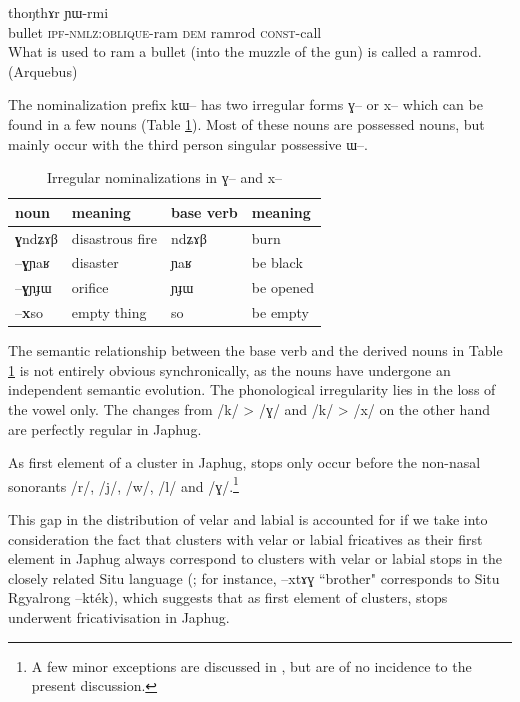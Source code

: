 \documentclass[oldfontcommands,oneside,a4paper,11pt]{article}
\newcommand{\ipa}[1]{{\phon \mbox{#1}}} %
\begin{document}
 \begin{exe}
\ex \label{ex:thongthar}
\gll [\ipa{qandʑi}   	\ipa{chɯ-sɤ-ɣnda}]   	\ipa{nɯ}   	\ipa{thoŋthɤr}   	  	\ipa{ɲɯ-rmi}    \\
bullet \textsc{ipf}-\textsc{nmlz:oblique}-ram   \textsc{dem} ramrod \textsc{const}-call \\
 \glt What is used to ram a bullet (into the muzzle of the gun) is called a ramrod. (Arquebus)
 \end{exe}


The nominalization prefix \ipa{kɯ}-- has two irregular forms   \ipa{ɣ}-- or \ipa{x}-- which can be found in a few nouns  (Table \ref{tab:irr.nmlz}). Most of these nouns are possessed nouns, but mainly occur with the third person singular possessive \ipa{ɯ}--.

\begin{table}[H]
\caption{Irregular nominalizations in \ipa{ɣ}-- and \ipa{x}--} \label{tab:irr.nmlz} \centering
\begin{tabular}{llll}
\toprule
 noun & meaning &base verb & meaning\\
\midrule
\ipa{\textbf{ɣ}ndʑɤβ} & disastrous fire & \ipa{ndʑɤβ} & burn \\
\ipa{--\textbf{ɣ}ɲaʁ}   &disaster& \ipa{ɲaʁ} & be black \\
\ipa{--\textbf{ɣ}ɲɟɯ}   & orifice & \ipa{ɲɟɯ} & be opened \\
\ipa{--\textbf{x}so}   &  empty thing &\ipa{so} & be empty \\
\bottomrule
\end{tabular}
\end{table}

The semantic relationship between the base verb and the derived nouns in Table \ref{tab:irr.nmlz} is not entirely obvious synchronically, as the nouns have undergone an independent semantic evolution. The phonological irregularity lies in the loss of the vowel only. The changes from /k/ > /ɣ/ and /k/ > /x/ on the other hand are perfectly regular in Japhug.

As first element of a cluster in Japhug, stops only occur before the non-nasal sonorants /r/, /j/, /w/, /l/ and /ɣ/.\footnote{A few minor exceptions are discussed in \citealt[45, 261]{jacques04these}, but are of no incidence to the present discussion.}

This gap in the distribution of velar and labial is accounted for if we take into consideration the fact that clusters with velar or labial fricatives as their first element in Japhug always correspond to clusters with velar or labial stops in the closely related Situ language  (\citealt[270]{jacques04these}; for instance,  \ipa{--xtɤɣ} ``brother" corresponds to Situ Rgyalrong \ipa{--kték}), which suggests that as first element of clusters, stops underwent fricativisation in Japhug. 
\end{document}
